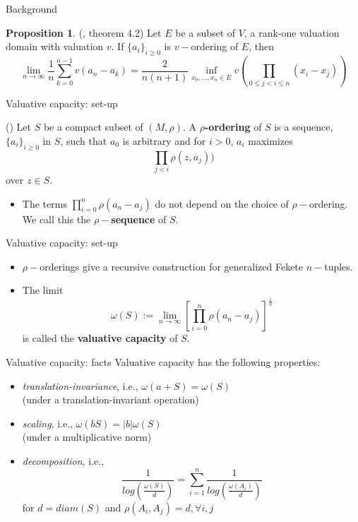 \documentclass{beamer}
\theoremstyle{definition}
\newtheorem*{proposition*}{Proposition}
\begin{document}
\begin{frame}{Background}
\begin{proposition*}
	(\cite{jlc}, theorem 4.2)	Let $E$ be a subset of $V$, a rank-one valuation domain with valuation $v$. If $\{a_i\}_{i \geq 0}$ is $v-$ordering of $E$, then
	\[\lim_{n\to\infty} \frac{1}{n} \sum_{k=0}^{n-1} v(a_n-a_k) =\frac{2}{n(n+1)} \inf_{x_0, \ldots, x_n \in E} v (\prod_{0\leq j < i \leq n} (x_i-x_j))\]
\end{proposition*}
\end{frame}

\begin{frame}{Valuative capacity: set-up}
	\begin{definition}
		(\cite{kj}) Let $S$ be a compact subset of $(M,\rho)$. A \textbf{$\rho$-ordering} of $S$ is a sequence, $\{a_i\}_{i\geq 0}$ in $S$, such that $a_0$ is arbitrary and for $i >0$, $a_i$ maximizes 
		\[ \prod_{j < i} \rho(z, a_j) )\] over $z \in S$.\\
	\end{definition}
	\pause
    \begin{itemize}
	   \item The terms $\prod_{i=0}^n \rho(a_n - a_j)$ do not depend on the choice of $\rho-$ordering. We call this the \textbf{$\rho-$sequence} of $S$. \\
	\end{itemize}
\end{frame}

\begin{frame}{Valuative capacity: set-up}
	\begin{itemize}
		\item $\rho-$orderings give a recursive construction for generalized Fekete $n-$tuples.\\	
		\pause	
		\item The limit \[ \omega(S):= \lim_{n\to\infty} [\prod_{i=0}^n \rho(a_n - a_j)]^{\frac{1}{n}}\] is called the \textbf{valuative capacity} of $S$.
	\end{itemize}		  
\end{frame}

\begin{frame}{Valuative capacity: facts}
Valuative capacity has the following properties:
\begin{itemize}
	\item \textit{translation-invariance}, i.e., $\omega(a+S) = \omega(S)$\\ (under a translation-invariant operation)
	\pause
	\item \textit{scaling}, i.e., $\omega(bS) = \lvert b\rvert \omega(S)$\\ (under a multiplicative norm)
	\pause
	\item \textit{decomposition}, i.e., \[\frac{1}{log(\frac{\omega(S)}{d}) } = \sum_{i=1}^n \frac{1}{log(\frac{\omega(A_i)}{d})}\]
	for $d=diam(S)$ and $\rho(A_i, A_j)=d, \forall i,j$ 
\end{itemize}	
\end{frame}
\end{document}
